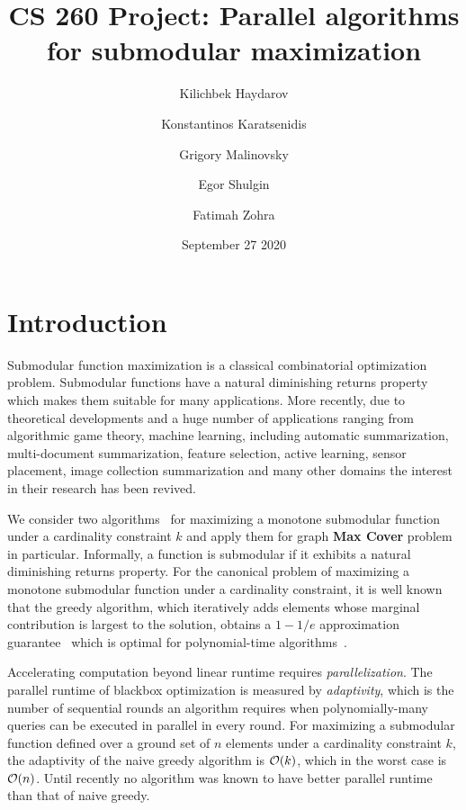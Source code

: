 \documentclass[11pt, a4paper]{article}
\title{CS 260 Project: Parallel algorithms for submodular maximization}
\author{Kilichbek Haydarov \and Konstantinos Karatsenidis \and Grigory Malinovsky \and Egor Shulgin \and Fatimah Zohra}
\date{September 27 2020}
\begin{document}
\maketitle

\section{Introduction}
Submodular function maximization is a classical combinatorial optimization problem. Submodular functions have a natural diminishing returns property which makes them suitable for many applications. More recently, due to theoretical developments and a huge number of applications ranging from algorithmic
game theory, machine learning, including automatic summarization, multi-document summarization, feature selection, active learning, sensor placement, image collection summarization and many other domains the interest in their research has been revived.

We consider two algorithms~\cite{chekuri2018submodular, breuer2019fast} for maximizing a monotone submodular function under a cardinality constraint $k$ and apply them for graph \textbf{Max Cover} problem in particular.
Informally, a function is submodular if it exhibits a natural diminishing returns property.  For the canonical problem of maximizing a monotone submodular function under a cardinality constraint, it is well known that the greedy algorithm, which iteratively adds elements whose marginal contribution is largest to the solution, obtains a $1-1/e$ approximation guarantee~\cite{NWF78} which is optimal for polynomial-time algorithms~\cite{nemhauser1978best}.

Accelerating computation beyond linear runtime requires \emph{parallelization}.  The parallel runtime of blackbox optimization is measured by \emph{adaptivity}, which is the number of sequential rounds an algorithm requires when polynomially-many queries can be executed in parallel in every round.  For maximizing a submodular function defined over a ground set of $n$ elements under a cardinality constraint $k$, the adaptivity of the naive greedy algorithm is ${\cal O}(k)$, which in the worst case is ${\cal O}(n)$.  Until recently no algorithm was known to have better parallel runtime than that of naive greedy. 
\end{document}
